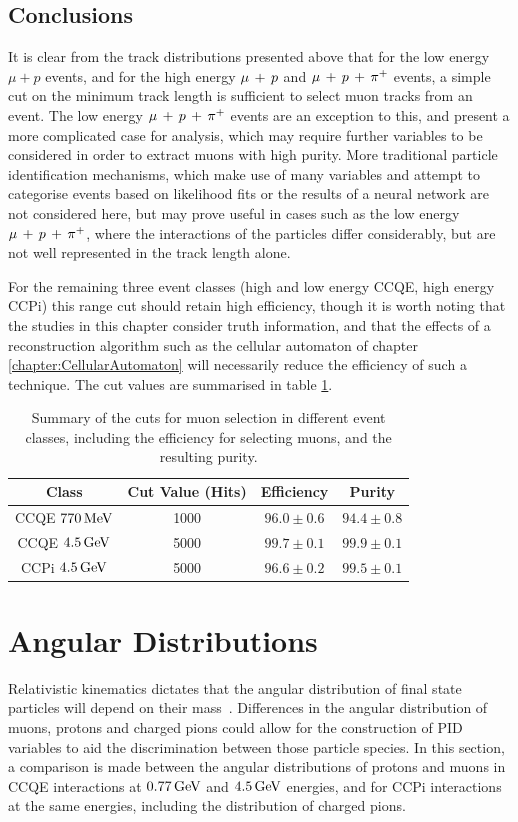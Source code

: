 \subsection{Conclusions}
It is clear from the track distributions presented above that for the low energy $\mu + p$ events, and for the high energy $\mu\,+\,p$ and $\mu\,+\,p\,+\,\pi^{+}$ events, a simple cut on the minimum track length is sufficient to select muon tracks from an event. The low energy $\mu\,+\,p\,+\,\pi^{+}$ events are an exception to this, and present a more complicated case for analysis, which may require further variables to be considered in order to extract muons with high purity. More traditional particle identification mechanisms, which make use of many variables and attempt to categorise events based on likelihood fits or the results of a neural network are not considered here, but may prove useful in cases such as the low energy $\mu\,+\,p\,+\,\pi^{+}$, where the interactions of the particles differ considerably, but are not well represented in the track length alone.

For the remaining three event classes (high and low energy CCQE, high energy \acs{CCPi}) this range cut should retain high efficiency, though it is worth noting that the studies in this chapter consider truth information, and that the effects of a reconstruction algorithm such as the cellular automaton of chapter \ref{chapter:CellularAutomaton} will necessarily reduce the efficiency of such a technique. The cut values are summarised in table \ref{table:summary_cuts}.

\begin{table}
\centering
\begin{tabular}{cccc}
Class & Cut Value (Hits) & Efficiency & Purity \\
\hline
\hline
CCQE $770\,\mathrm{MeV}$ & 1000 & $96.0\pm0.6$ & $94.4\pm0.8$ \\
CCQE $4.5\,\mathrm{GeV}$ & 5000 & $99.7\pm0.1$ & $99.9\pm0.1$ \\
\acs{CCPi} $4.5\,\mathrm{GeV}$ & 5000 & $96.6\pm0.2$ & $99.5\pm0.1$ \\
\hline
\end{tabular}
\caption[Summary of cuts with efficiencies and purities]{\label{table:summary_cuts}Summary of the cuts for muon selection in different event classes, including the efficiency for selecting muons, and the resulting purity.}
\end{table}

\section{Angular Distributions}
Relativistic kinematics dictates that the angular distribution of final state particles will depend on their mass~\citep{PDG2012}. Differences in the angular distribution of muons, protons and charged pions could allow for the construction of PID variables to aid the discrimination between those particle species. In this section, a comparison is made between the angular distributions of protons and muons in \acs{CCQE} interactions at $0.77\,\mathrm{GeV}$ and $4.5\,\mathrm{GeV}$ energies, and for \acs{CCPi} interactions at the same energies, including the distribution of charged pions.

